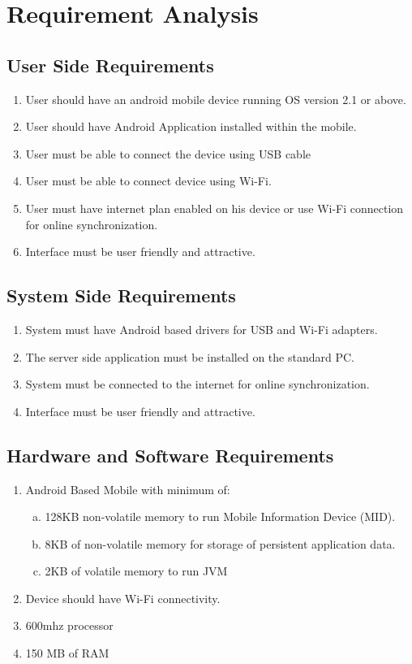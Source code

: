 \chapter{Requirement Analysis}
\section{User Side Requirements}
\begin{enumerate}
 \item User should have an android mobile device running OS version 2.1 or above.
 \item User should have Android Application installed within the mobile.
 \item User must be able to connect the device using USB cable
 \item User must be able to connect device using Wi-Fi.
 \item User must have internet plan enabled on his device or use Wi-Fi connection for
online synchronization.
 \item Interface must be user friendly and attractive.
\end{enumerate}

\section{System Side Requirements}
\begin{enumerate}
 \item System must have Android based drivers for USB and Wi-Fi adapters.
 \item The server side application must be installed on the standard PC.
 \item System must be connected to the internet for online synchronization.
 \item Interface must be user friendly and attractive.
\end{enumerate}

\section{Hardware and Software Requirements}
\begin{enumerate}
 \item Android Based Mobile with minimum of:
 \begin{enumerate}[a. ]
  \item 128KB non-volatile memory to run Mobile Information Device (MID).
  \item 8KB of non-volatile memory for storage of persistent application data.
  \item 2KB of volatile memory to run JVM
 \end{enumerate}
 \item Device should have Wi-Fi connectivity.
 \item 600mhz processor
 \item 150 MB of RAM
\end{enumerate}

